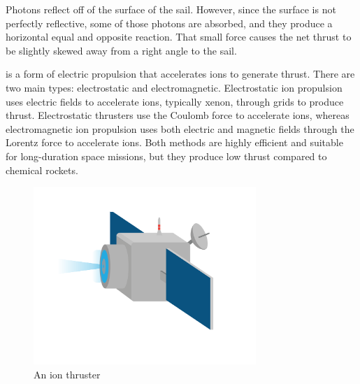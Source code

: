 Photons reflect off of the surface of the sail. However, since the surface is not perfectly reflective, some of those photons are absorbed, and they produce a horizontal equal and opposite reaction. That small force causes the net thrust to be slightly skewed away from a right angle to the sail.

 is a form of electric propulsion that accelerates ions to generate thrust. There are two main types: electrostatic and electromagnetic. 
Electrostatic ion propulsion uses electric fields to accelerate ions, typically xenon, through grids to produce thrust.  Electrostatic thrusters use the Coulomb 
force to accelerate ions, whereas electromagnetic ion propulsion uses both electric and magnetic fields through the Lorentz force to accelerate ions. Both methods 
are highly efficient and suitable for long-duration space missions, but they produce low thrust compared to chemical rockets.


\begin{figure}[htbp]
    \centering
	\includegraphics[width=0.75\textwidth]{ionThruster.png}
    \caption{An ion thruster}
    \label{fig:ionThruster}
\end{figure}





